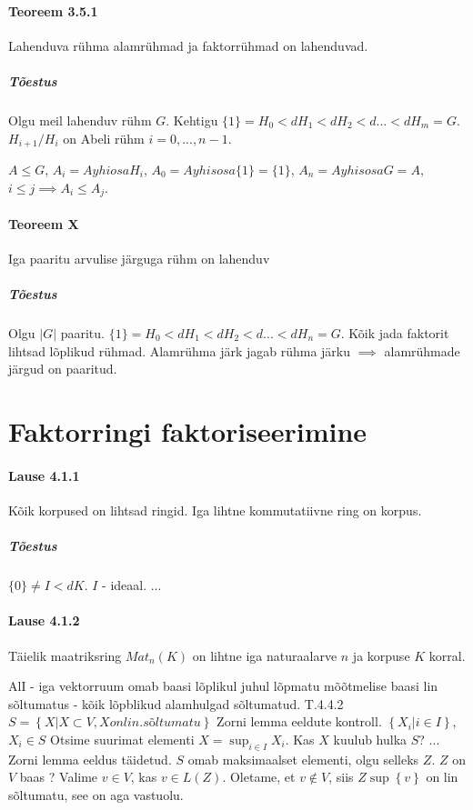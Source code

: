 \documentclass[12pt]{article}
\begin{document}
\paragraph{Teoreem 3.5.1} Lahenduva r\"uhma alamrühmad ja faktorrühmad on lahenduvad.

\subparagraph{Tõestus} Olgu meil lahenduv rühm $G$. Kehtigu $\{1\} = H_0 <d H_1 <d H_2 <d ... <d H_m = G$. $H_{i+1}/H_i $ on Abeli rühm $i=0,...,n-1$. 

$A \leq G $, $ A_i = A yhiosa H_i$, $A_0 = A yhisosa \{1\} = \{1\}$, $A_n = A yhisosa G = A$, $i \leq j \implies A_i \leq A_j$. 

\paragraph{Teoreem X} Iga paaritu arvulise järguga rühm on lahenduv

\subparagraph{Tõestus}
Olgu $|G|$ paaritu. $\{1\} = H_0 <d H_1 <d H_2 <d ... <d H_n = G$. Kõik jada faktorit lihtsad lõplikud rühmad. Alamrühma järk jagab rühma järku $\implies$ alamr\"uhmade järgud on paaritud. 

\section{Faktorringi faktoriseerimine}

\paragraph{Lause 4.1.1} Kõik korpused on lihtsad ringid. Iga lihtne kommutatiivne ring on korpus. 

\subparagraph{Tõestus} $\{0\} \neq I <d K$. $I$ - ideaal. ...

\paragraph{Lause 4.1.2} Täielik maatriksring $Mat_n (K)$ on lihtne iga naturaalarve $n$ ja korpuse $K$ korral. 


AlI - iga vektorruum omab baasi lõplikul juhul
lõpmatu mõõtmelise baasi lin sõltumatus - kõik lõpblikud alamhulgad sõltumatud.
T.4.4.2
$S = \left\{ X | X \subset V, X on lin. sõltumatu \right\}$
Zorni lemma eeldute kontroll.
$\left\{ X_i | i \in I \right\}$, $X_i \in S$ Otsime suurimat elementi
$X = \sup_{i \in I} X_i$. Kas $X$ kuulub hulka $S$?
...
Zorni lemma eeldus täidetud.
$S$ omab maksimaalset elementi, olgu selleks $Z$. $Z$ on $V$ baas ? 
Valime $v \in V$, kas $v \in L(Z)$. Oletame, et $v \not \in V$, siis $Z \sup \left\{ v \right\}$ on lin sõltumatu, see on aga vastuolu.
\end{document}
